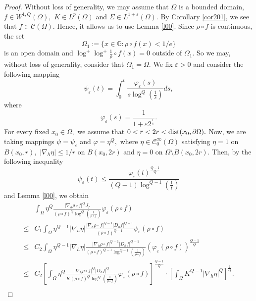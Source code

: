 \documentclass[11pt,twoside]{article}
\theoremstyle{definition}
\theoremstyle{remark}
\begin{document}
\begin{proof}
Without loss of generality, we may assume that $\Omega$ is a bounded domain, $f\in W^{1,Q}(\Omega),$ $K\in L^{p}(\Omega)$ and $\Sigma\in L^{1+\varepsilon}(\Omega).$
By Corollary \ref{cor201}, we see that $f\in \mathcal{C}(\Omega).$ Hence, it allows us to use  Lemma \ref{l00}. Since $\rho\circ f$ is continuous,  the set $$\Omega_{1}:=\{x\in\mathbb{G}:\rho\circ f(x)<1/e\}$$ is an open domain and $\log^{+}\log^{+}\frac{1}{\rho}\circ f(x)=0$ outside of $\Omega_{1}.$ So we may, without loss of generality, consider that $\Omega_{1}=\Omega.$ We fix $\varepsilon>0$ and consider the following mapping 
$$\psi_{\varepsilon}(t)=\int_{0}^{t}\frac{\varphi_{\varepsilon}(s)}{s\log^{Q}(\frac{1}{s})}ds,$$
where $$\varphi_{\varepsilon}(s)=\frac{1}{1+\varepsilon2^{\frac{1}{s}}}.$$
For every fixed $x_{0}\in \Omega,$ we assume that $0<r<2r<{\rm dist}(x_{0},\partial \Omega).$ Now, we are taking mappings $\psi=\psi_{\varepsilon}$ and $\varphi=\eta^{Q},$ where $\eta\in \mathcal{C}_{0}^{\infty}(\Omega)$ satisfying $\eta=1$ on $B(x_{0},r),$ $\vert\nabla_{h}\eta\vert\leq1/r$ on $B(x_{0},2r)$ and $\eta=0$ on $\Omega\setminus B(x_{0},2r).$
Then, by the following inequality 
$$\psi_{\varepsilon}(t)\leq\frac{\varphi_{\varepsilon}(t)^{\frac{Q-1}{Q}}}{(Q-1)\log^{Q-1}(\frac{1}{t})}$$
and Lemma \ref{l00}, we obtain 
\begin{equation}\label{09}
\begin{aligned}
&\int_{\Omega}\eta^{Q}\frac{\vert\nabla_{h}\rho\circ f\vert^{Q}J_{f}}{(\rho\circ f)^{Q}\log^{Q}(\frac{1}{\rho\circ f})}\varphi_{\varepsilon}(\rho\circ f)\\
\leq& C_{1} \int_{\Omega}\eta^{Q-1}\vert\nabla_{h}\eta\vert\frac{\vert\nabla_{h}\rho\circ f\vert^{Q-1}\vert D_{h}f\vert^{Q-1}}{(\rho\circ f)^{Q-1}}\psi_{\varepsilon}(\rho\circ f) \\
\leq& C_{2} \int_{\Omega}\eta^{Q-1}\vert\nabla_{h}\eta\vert\frac{\vert\nabla_{h}\rho\circ f\vert^{Q-1}\vert D_{h}f\vert^{Q-1}}{(\rho\circ f)^{Q-1}\log^{Q-1}(\frac{1}{\rho\circ f})}\left(\varphi_{\varepsilon}(\rho\circ f)\right)^{\frac{Q-1}{Q}}\\
\leq& C_{2} \left[\int_{\Omega}\eta^{Q}\frac{\vert\nabla_{h}\rho\circ f\vert^{Q}\vert D_{h}f\vert^{Q}}{K(\rho\circ f)^{Q}\log^{Q}(\frac{1}{\rho\circ f})}\varphi_{\varepsilon}(\rho\circ f)\right]^{\frac{Q-1}{Q}}\cdot\left[\int_{\Omega}K^{Q-1}\vert\nabla_{h}\eta\vert^{Q}\right]^{\frac{1}{Q}}.\\
\end{aligned}
\end{equation}

\end{proof}
\end{document}
